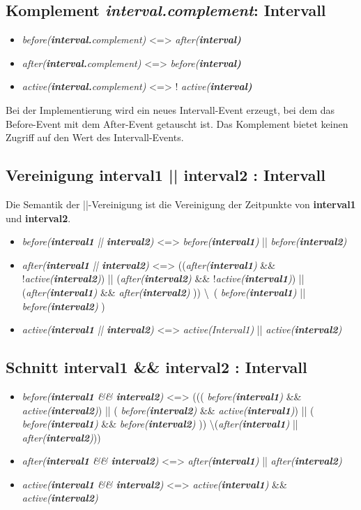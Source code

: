 \documentclass[article,colorback,accentcolor=tud4c]{tudreport}
\newcommand{\before}[1]{\textit{ before(#1) }}
\newcommand{\after}[1]{\textit{after(#1)}}
\newcommand{\aktiv}[1]{\textit{active(#1)}}
\newcommand{\Interval}[1]{\textbf{interval#1}}
\newcommand{\comp}[1]{\textit{#1.complement}}
\begin{document}
\subsection{Komplement \comp\Interval : Intervall}
\begin{itemize}
\item \before{\comp{\Interval}} <=> \after{\Interval}
\item \after{\comp{\Interval}} <=> \before{\Interval} 
\item \aktiv{\comp{\Interval}} <=> ! \aktiv{\Interval}
\end{itemize}
Bei der Implementierung wird ein neues Intervall-Event erzeugt, bei dem das 
Before-Event mit dem After-Event getauscht ist. Das Komplement bietet keinen
Zugriff auf den Wert des Intervall-Events.

\subsection{Vereinigung \Interval{1} || \Interval{2} : Intervall}
Die Semantik der ||-Vereinigung ist die Vereinigung der Zeitpunkte von
\Interval{1} und \Interval{2}.
\begin{itemize}
\item \before{\Interval{1} || \Interval{2}}  <=> \before{\Interval{1}} || \before{\Interval{2}}
\item \after{\Interval{1} || \Interval{2}} <=> ((\after{\Interval{1}} \&\&
!\aktiv{\Interval{2}}) || (\after{\Interval{2}} \&\& !\aktiv{\Interval{1}}) ||
(\after{\Interval{1}} \&\& \after{\Interval{2}} )) \textbackslash\ (\before{\Interval{1}}|| \before{\Interval{2}})
\item \aktiv{\Interval{1} || \Interval{2}} <=> \aktiv{Interval{1}} || \aktiv{\Interval{2}}

\end{itemize}

\subsection{Schnitt \Interval{1} \&\& \Interval{2} : Intervall}
\begin{itemize}
\item \before{\Interval{1} \&\& \Interval{2}} <=> (((\before{\Interval{1}} \&\& \aktiv{\Interval{2}}) ||
(\before{\Interval{2}} \&\& \aktiv{\Interval{1}}) || (\before{\Interval{1}} \&\& \before{\Interval{2}}))
\textbackslash (\after{\Interval{1}} || \after{\Interval{2}}))
\item \after{\Interval{1} \&\& \Interval{2}} <=> \after{\Interval{1}} ||
\after{\Interval{2}}
\item \aktiv{\Interval{1} \&\& \Interval{2}} <=> \aktiv{\Interval{1}} \&\& \aktiv{\Interval{2}}
\end{itemize}
\end{document}

